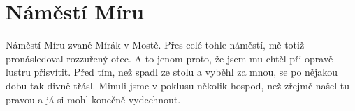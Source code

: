 
\chapter{Náměstí Míru}

Náměstí Míru zvané Mírák v Mostě. Přes celé tohle náměstí, mě totiž
pronásledoval rozzuřený otec. A to jenom proto, že jsem mu chtěl při opravě
lustru přisvítit. Před tím, než spadl ze stolu a vyběhl za mnou, se po nějakou
dobu tak divně třásl. Minuli jsme v poklusu několik hospod, než zřejmě našel tu
pravou a já si mohl konečně vydechnout.


